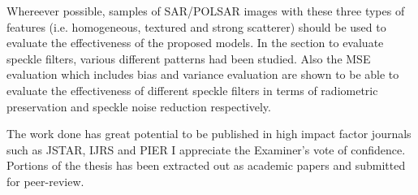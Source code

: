 \replyToComment
    {Whereever possible, samples of SAR/POLSAR images with these three types of features (i.e. homogeneous, textured and strong scatterer) should be used to evaluate the effectiveness of the proposed models.}
    {In the section to evaluate speckle filters, various different patterns had been studied. Also the MSE evaluation which includes bias and variance evaluation are shown to be able to evaluate the effectiveness of different speckle filters in terms of radiometric preservation and speckle noise reduction respectively.}
    
\replyToComment
    {The work done has great potential to be published in high impact factor journals such as JSTAR, IJRS and PIER}
    {I appreciate the Examiner's vote of confidence. Portions of the thesis has been extracted out as academic papers and submitted for peer-review.}    
    
